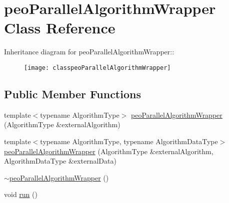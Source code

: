 \hypertarget{classpeoParallelAlgorithmWrapper}{
\section{peo\-Parallel\-Algorithm\-Wrapper Class Reference}
\label{classpeoParallelAlgorithmWrapper}
}
Inheritance diagram for peo\-Parallel\-Algorithm\-Wrapper::\begin{figure}[H]
\begin{center}
\leavevmode
\texttt{[image: classpeoParallelAlgorithmWrapper]}
\end{center}
\end{figure}
\subsection*{Public Member Functions}
\begin{CompactItemize}
\item 
\hypertarget{classpeoParallelAlgorithmWrapper_e1e1de8b007934080876df1c65c4d8b0}{
template$<$typename Algorithm\-Type$>$ \hyperlink{classpeoParallelAlgorithmWrapper_e1e1de8b007934080876df1c65c4d8b0}{peo\-Parallel\-Algorithm\-Wrapper} (Algorithm\-Type \&external\-Algorithm)}
\label{classpeoParallelAlgorithmWrapper_e1e1de8b007934080876df1c65c4d8b0}

\item 
\hypertarget{classpeoParallelAlgorithmWrapper_1ebfe70e6826002f6280aba01e141ad5}{
template$<$typename Algorithm\-Type, typename Algorithm\-Data\-Type$>$ \hyperlink{classpeoParallelAlgorithmWrapper_1ebfe70e6826002f6280aba01e141ad5}{peo\-Parallel\-Algorithm\-Wrapper} (Algorithm\-Type \&external\-Algorithm, Algorithm\-Data\-Type \&external\-Data)}
\label{classpeoParallelAlgorithmWrapper_1ebfe70e6826002f6280aba01e141ad5}

\item 
\hypertarget{classpeoParallelAlgorithmWrapper_0e64f517afe790db467750a6980e1666}{
\hyperlink{classpeoParallelAlgorithmWrapper_0e64f517afe790db467750a6980e1666}{$\sim$peo\-Parallel\-Algorithm\-Wrapper} ()}
\label{classpeoParallelAlgorithmWrapper_0e64f517afe790db467750a6980e1666}

\item 
\hypertarget{classpeoParallelAlgorithmWrapper_4b10b46b4ea2e3f66c660c15f3c98e6c}{
void \hyperlink{classpeoParallelAlgorithmWrapper_4b10b46b4ea2e3f66c660c15f3c98e6c}{run} ()}
\label{classpeoParallelAlgorithmWrapper_4b10b46b4ea2e3f66c660c15f3c98e6c}

\end{CompactItemize}
